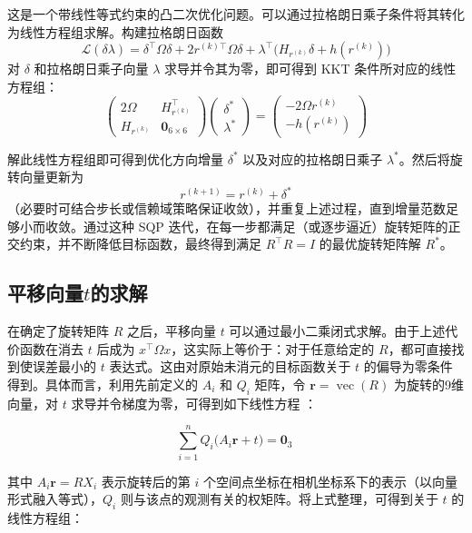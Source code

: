 这是一个带线性等式约束的凸二次优化问题。可以通过拉格朗日乘子条件将其转化为线性方程组求解。构建拉格朗日函数
\begin{equation}
	\mathcal{L}(\delta \lambda) 
	 =  
	\delta^\top \Omega  \delta 
	 +  
	2 r^{(k)\top}\Omega \delta 
	 + 
	\lambda^\top \bigl(H_{r^{(k)}} \delta + h(r^{(k)})\bigr)
\end{equation}
对 $\delta$ 和拉格朗日乘子向量 $\lambda$ 求导并令其为零，即可得到 KKT 条件所对应的线性方程组：
\begin{equation}
	\begin{pmatrix}
		2 \Omega & H_{r^{(k)}}^\top \\
		H_{r^{(k)}} & \mathbf{0}_{6\times 6}
	\end{pmatrix}
	\begin{pmatrix}
		\delta^* \\
		\lambda^*
	\end{pmatrix}
	 = 
	\begin{pmatrix}
		- 2 \Omega r^{(k)} \\
		- h(r^{(k)})
	\end{pmatrix}
\end{equation}

解此线性方程组即可得到优化方向增量 $\delta^*$ 以及对应的拉格朗日乘子 $\lambda^*$。然后将旋转向量更新为
\begin{equation}
	r^{(k+1)} 
	 = 
	r^{(k)} + \delta^*
\end{equation}
（必要时可结合步长或信赖域策略保证收敛），并重复上述过程，直到增量范数足够小而收敛。通过这种 SQP 迭代，在每一步都满足（或逐步逼近）旋转矩阵的正交约束，并不断降低目标函数，最终得到满足 $R^\top R=I$ 的最优旋转矩阵解 $R^*$。
\subsection{平移向量$t$的求解}
在确定了旋转矩阵 $R$ 之后，平移向量 $t$ 可以通过最小二乘闭式求解。由于上述代价函数在消去 $t$ 后成为 $x^\top \Omega x$，这实际上等价于：对于任意给定的 $R$，都可直接找到使误差最小的 $t$ 表达式。这由对原始未消元的目标函数关于 $t$ 的偏导为零条件得到。具体而言，利用先前定义的 $A_i$ 和 $Q_i$ 矩阵，令 $\mathbf{r} = \operatorname{vec}(R)$ 为旋转的9维向量，对 $t$ 求导并令梯度为零，可得到如下线性方程​
：

\begin{equation} 
	\sum_{i=1}^n Q_i \big(A_i \mathbf{r} + t\big) =  \mathbf{0}_3~
\end{equation}

其中 $A_i \mathbf{r} = R X_i$ 表示旋转后的第 $i$ 个空间点坐标在相机坐标系下的表示（以向量形式融入等式），$Q_i$ 则与该点的观测有关的权矩阵。将上式整理，可得到关于 $t$ 的线性方程组：

